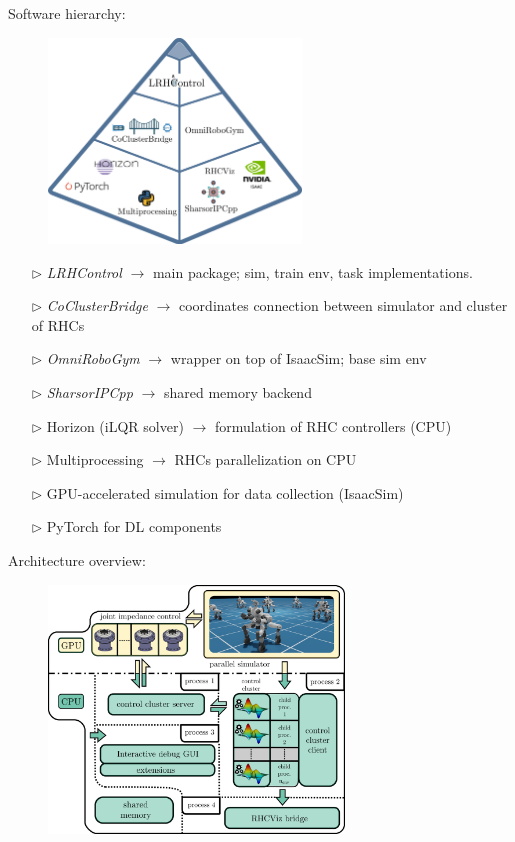 \begin{Large}
	\vskip1cm
	\hskip0.5cm Software hierarchy:
	\begin{figure}[h]
		\includegraphics[width=0.6\textwidth]{docs/imgs/ecosystem.png}
	\end{figure}
	\begin{itemize}
		\item[$\rhd$] \textit{LRHControl} $\rightarrow$ main package; sim, train env, task implementations.\vskip0.3cm
		\item[$\rhd$] \textit{CoClusterBridge} $\rightarrow$ coordinates connection between simulator and cluster of RHCs\vskip0.3cm
		\item[$\rhd$] \textit{OmniRoboGym} $\rightarrow$ wrapper on top of IsaacSim; base sim env\vskip0.3cm
		\item[$\rhd$] \textit{SharsorIPCpp} $\rightarrow$ shared memory backend\vskip0.3cm
		\item[$\rhd$] Horizon (iLQR solver) $\rightarrow$ formulation of RHC controllers (CPU)\vskip0.3cm
		\item[$\rhd$] Multiprocessing $\rightarrow$ RHCs parallelization on CPU\vskip0.3cm
		\item[$\rhd$] GPU-accelerated simulation for data collection (IsaacSim)\vskip0.3cm
		\item[$\rhd$] PyTorch for DL components\vskip0.3cm
	\end{itemize}\vskip0.5cm
	\hskip0.5cm Architecture overview:
	\begin{figure}[h]
		\includegraphics[width=0.7\textwidth]{docs/imgs/cocluster_arch_full.pdf}

\end{figure}
\end{Large}
